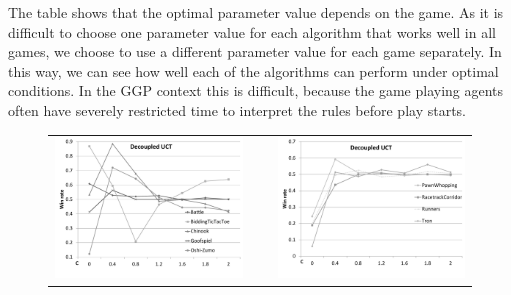 \documentclass[conference]{IEEEtran}
\begin{document}
The table shows that the optimal parameter value depends on the game. As it is difficult to choose one parameter value 
for each algorithm that works well in all games, we choose to use a different parameter value for each game separately. 
In this way, we can see how well each of the algorithms can perform under optimal conditions. In the GGP context 
this is difficult, because the game playing agents often have severely restricted time to interpret the 
rules before play starts. 

\begin{figure}[t!]
\centering
\begin{tabular}{ccc}
\includegraphics[scale=0.3]{figures/duct1} & ~ & \includegraphics[scale=0.3]{figures/duct2}\\

\end{tabular}
\end{figure}
\end{document}
